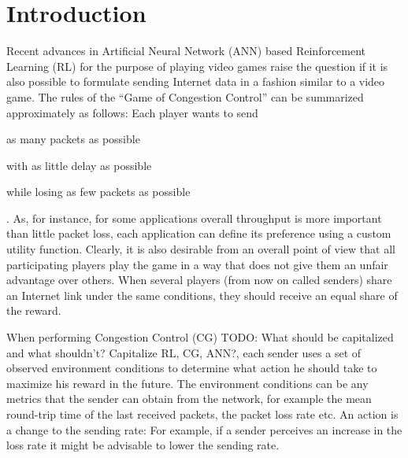 \documentclass[sigconf]{acmart}
\newcommand\note[2]{{\color{#1}#2}}
\newcommand\todo[1]{{\note{red}{TODO: #1}}}
\begin{document}



\maketitle%

\section{Introduction}

Recent advances in Artificial Neural Network (ANN) based Reinforcement Learning (RL) for the purpose of playing video games raise the question if it is also possible to formulate sending Internet data in a fashion similar to a video game. The rules of the ``Game of Congestion Control'' can be summarized approximately as follows: Each player wants to send \begin{enumerate*}
\item as many packets as possible
\item with as little delay as possible
\item while losing as few packets as possible
\end{enumerate*}. As, for instance, for some applications overall throughput is more important than little packet loss, each application can define its preference using a custom utility function. Clearly, it is also desirable from an overall point of view that all participating players play the game in a way that does not give them an unfair advantage over others. When several players (from now on called senders) share an Internet link under the same conditions, they should receive an equal share of the reward. 

When performing Congestion Control (CG) \todo{What should be capitalized and what shouldn't? Capitalize RL, CG, ANN?}, each sender uses a set of observed environment conditions to determine what action he should take to maximize his reward in the future. The environment conditions can be any metrics that the sender can obtain from the network, for example the mean round-trip time of the last received packets, the packet loss rate etc. An action is a change to the sending rate: For example, if a sender perceives an increase in the loss rate it might be advisable to lower the sending rate. 
\end{document}
